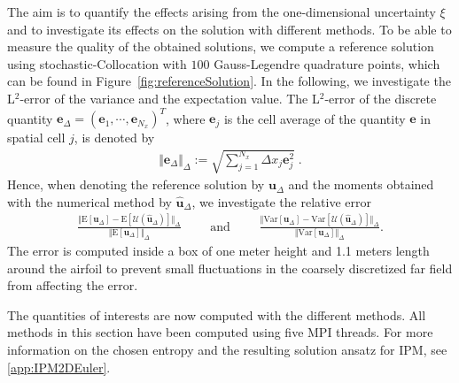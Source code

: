 The aim is to quantify the effects arising from the one-dimensional uncertainty $\xi$ and to investigate its effects on the solution with different methods. To be able to measure the quality of the obtained solutions, we compute a reference solution using stochastic-Collocation with $100$ Gauss-Legendre quadrature points, which can be found in Figure~\ref{fig:referenceSolution}. In the following, we investigate the L$^2$-error of the variance and the expectation value. The L$^2$-error of the discrete quantity $\bm e_{\Delta}=(\bm e_1,\cdots,\bm e_{N_x})^T$, where $\bm e_j$ is the cell average of the quantity $\bm e$ in spatial cell $j$, is denoted by
\begin{align*}
\Vert \bm e_{\Delta} \Vert_{\Delta} := \sqrt{\sum_{j=1}^{N_x} \Delta x_j \bm e_j^2}\;.
\end{align*}
Hence, when denoting the reference solution by $\bm u_{\Delta}$ and the moments obtained with the numerical method by $\hat{\bm u}_{\Delta}$, we investigate the relative error
\begin{align*}
\frac{\Vert \text{E}[\bm u_{\Delta}] - \text{E}[\mathcal{U}(\bm{\hat u}_{\Delta})] \Vert_{\Delta}}{\Vert \text{E}[\bm u_{\Delta}] \Vert_{\Delta}} \qquad \text{ and }\qquad \frac{\Vert \text{Var}[\bm u_{\Delta}] - \text{Var}[\mathcal{U}(\bm{\hat u}_{\Delta})] \Vert_{\Delta}}{\Vert \text{Var}[\bm u_{\Delta}] \Vert_{\Delta}}.
\end{align*}
The error is computed inside a box of one meter height and 1.1 meters length around the airfoil to prevent small fluctuations in the coarsely discretized far field from affecting the error.

The quantities of interests are now computed with the different methods. All methods in this section have been computed using five MPI threads. For more information on the chosen entropy and the resulting solution ansatz for IPM, see \ref{app:IPM2DEuler}. 

